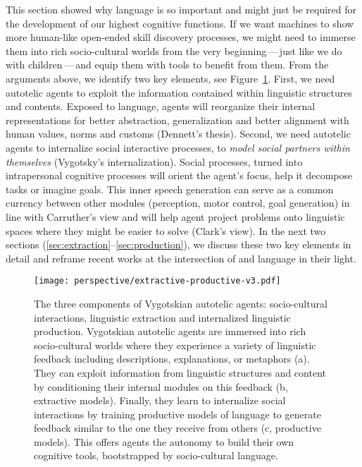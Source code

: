 This section showed why language is so important and might just be required for the development of our highest cognitive functions. If we want machines to show more human-like open-ended skill discovery processes, we might need to immerse them into rich socio-cultural worlds from the very beginning\,---\,just like we do with children\,---\,and equip them with tools to benefit from them. From the arguments above, we identify two key elements, see Figure~\ref{fig:extractive_productive}. First, we need autotelic agents to exploit the information contained within linguistic structures and contents. Exposed to language, agents will reorganize their internal representations for better abstraction, generalization and better alignment with human values, norms and customs (Dennett's thesis). Second, we need autotelic agents to internalize social interactive processes, \ie to \textit{model social partners within themselves} (Vygotsky's internalization). Social processes, turned into intrapersonal cognitive processes will orient the agent's focus, help it decompose tasks or imagine goals. This inner speech generation can serve as a common currency between other modules (\eg perception, motor control, goal generation) in line with Carruther's view and will help agent project problems onto linguistic spaces where they might be easier to solve (Clark's view). In the next two sections (\ref{sec:extraction}--\ref{sec:production}), we discuss these two key elements in detail and reframe recent works at the intersection of \rl and language in their light. 

\vspace{.4cm}
\begin{figure}[!ht]
    \centering
    \captionsetup{width=.85\linewidth}
    \texttt{[image: perspective/extractive-productive-v3.pdf]}
    \caption{\small The three components of Vygotskian autotelic agents: socio-cultural interactions, linguistic extraction and internalized linguistic production. Vygotskian autotelic agents are immersed into rich socio-cultural worlds where they experience a variety of linguistic feedback including descriptions, explanations, or metaphors (a). They can exploit information from linguistic structures and content by conditioning their internal modules on this feedback (b, extractive models). Finally, they learn to internalize social interactions by training productive models of language to generate feedback similar to the one they receive from others (c, productive models). This offers agents the autonomy to build their own cognitive tools, bootstrapped by socio-cultural language.}
    \label{fig:extractive_productive}
\end{figure}
\vspace{.4cm}



